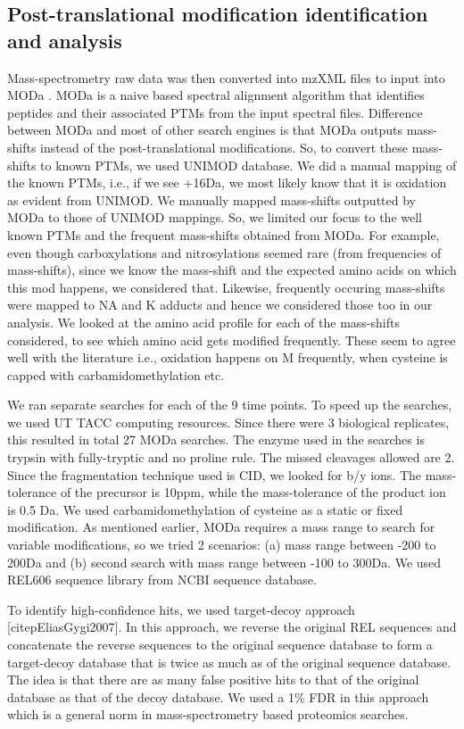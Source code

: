 \documentclass[12pt]{article}
\begin{document}
\subsection{Post-translational modification identification and analysis} 

Mass-spectrometry raw data was then converted into mzXML files to input into MODa \cite{Naetal2012}. MODa is a naive based spectral alignment algorithm that identifies peptides and their associated PTMs from the input spectral files. Difference between MODa and most of other search engines is that MODa outputs mass-shifts instead of the post-translational modifications. So, to convert these mass-shifts to known PTMs, we used UNIMOD database. We did a manual mapping of the known PTMs, i.e., if we see +16Da, we most likely know that it is oxidation as evident from UNIMOD. We manually mapped mass-shifts outputted by MODa to those of UNIMOD mappings. So, we limited our focus to the well known PTMs and the frequent mass-shifts obtained from MODa. For example, even though carboxylations and nitrosylations seemed rare (from frequencies of mass-shifts), since we know the mass-shift and the expected amino acids on which this mod happens, we considered that. Likewise, frequently occuring mass-shifts were mapped to NA and K adducts and hence we considered those too in our analysis. We looked at the amino acid profile for each of the mass-shifts considered, to see which amino acid gets modified frequently. These seem to agree well with the literature i.e., oxidation happens on M frequently, when cysteine is capped with carbamidomethylation etc. 

We ran separate searches for each of the 9 time points. To speed up the searches, we used UT TACC computing resources. Since there were 3 biological replicates, this resulted in total 27 MODa searches. The enzyme used in the searches is trypsin with fully-tryptic and no proline rule. The missed cleavages allowed are 2. Since the fragmentation technique used is CID, we looked for b/y ions. The mass-tolerance of the precursor is 10ppm, while the mass-tolerance of the product ion is 0.5 Da. We used carbamidomethylation of cysteine as a static or fixed modification. As mentioned earlier, MODa requires a mass range to search for variable modifications, so we tried 2 scenarios: (a) mass range between -200 to 200Da and (b) second search with mass range between -100 to 300Da. We used REL606 sequence library from NCBI sequence database. 

To identify high-confidence hits, we used target-decoy approach [citep{EliasGygi2007}]. In this approach, we reverse the original REL sequences and concatenate the reverse sequences to the original sequence database to form a target-decoy database that is twice as much as of the original sequence database. The idea is that there are as many false positive hits to that of the original database as that of the decoy database. We used a 1\% FDR in this approach which is a general norm in mass-spectrometry based proteomics searches.
\end{document}

